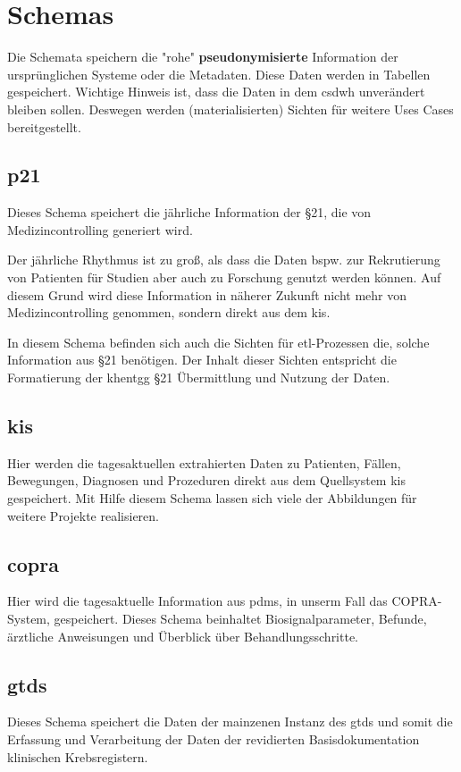 \chapter{Schemas}
\label{ch:schema}

	Die Schemata speichern die "rohe" \textbf{pseudonymisierte} Information der ursprünglichen Systeme oder die Metadaten. Diese Daten werden in Tabellen gespeichert. Wichtige Hinweis ist, dass die Daten in dem \ac{csdwh} unverändert bleiben sollen. Deswegen werden (materialisierten) Sichten für weitere Uses Cases bereitgestellt. 

  \section{p21} \label{sc:p21}
  Dieses Schema speichert die jährliche Information der \S21, die von Medizincontrolling generiert wird. 
  
  Der jährliche Rhythmus ist zu groß, als dass die Daten bspw. zur Rekrutierung von Patienten für Studien aber auch zu Forschung genutzt werden können. Auf diesem Grund wird diese Information in näherer Zukunft nicht mehr von Medizincontrolling genommen, sondern direkt aus dem \ac{kis}.
  
  In diesem Schema befinden sich auch die Sichten für \ac{etl}-Prozessen die, solche Information aus \S21 benötigen. Der Inhalt dieser Sichten entspricht die Formatierung der \ac{khentgg} \S 21 Übermittlung und Nutzung der Daten.

  \section{kis} \label{sc:kis}
   Hier werden die tagesaktuellen extrahierten Daten zu Patienten, Fällen, Bewegungen, Diagnosen und Prozeduren direkt aus dem Quellsystem \ac{kis} gespeichert. Mit Hilfe diesem Schema lassen sich viele der Abbildungen für weitere Projekte realisieren.
  
  \section{copra} \label{sc:copra}
  Hier wird die tagesaktuelle Information aus \ac{pdms}, in unserm Fall das COPRA-System, gespeichert. Dieses Schema beinhaltet Biosignalparameter, Befunde, ärztliche Anweisungen und Überblick über Behandlungsschritte.


  \section{gtds} \label{sc:gtds}
  Dieses Schema speichert die Daten der mainzenen Instanz des \acf{gtds} und somit die Erfassung und Verarbeitung der Daten der revidierten Basisdokumentation klinischen Krebsregistern.

